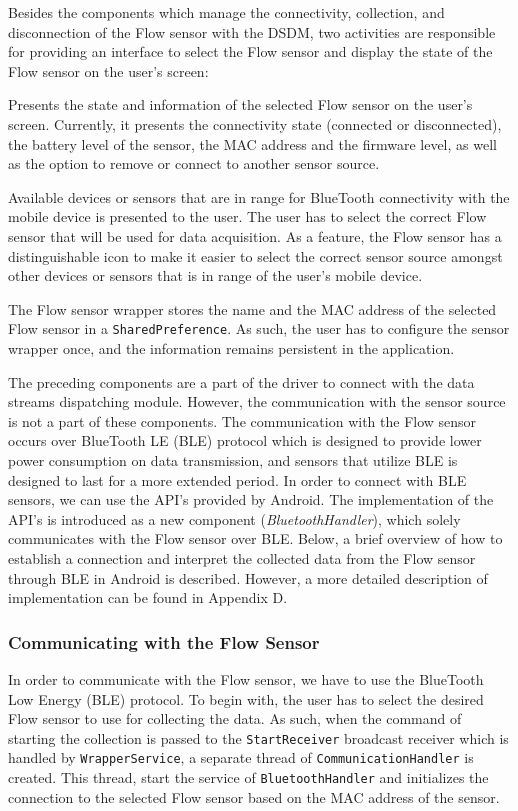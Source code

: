 Besides the components which manage the connectivity, collection, and disconnection of the Flow sensor with the DSDM, two activities are responsible for providing an interface to select the Flow sensor and display the state of the Flow sensor on the user's screen:
\begin{description}[font=\normalfont\itshape]
    \item[MainActivity:] Presents the state and information of the selected Flow sensor on the user's screen. Currently, it presents the connectivity state (connected or disconnected), the battery level of the sensor, the MAC address and the firmware level, as well as the option to remove or connect to another sensor source. 
    \item[DeviceListActivity:] Available devices or sensors that are in range for BlueTooth connectivity with the mobile device is presented to the user. The user has to select the correct  Flow sensor that will be used for data acquisition.  As a feature, the Flow sensor has a distinguishable icon to make it easier to select the correct sensor source amongst other devices or sensors that is in range of the user's mobile device.
\end{description}
The Flow sensor wrapper stores the name and the MAC address of the selected Flow sensor in a \verb|SharedPreference|. As such, the user has to configure the sensor wrapper once, and the information remains persistent in the application.

The preceding components are a part of the driver to connect with the data streams dispatching module. However, the communication with the sensor source is not a part of these components. The communication with the Flow sensor occurs over BlueTooth LE (BLE) protocol which is designed to provide lower power consumption on data transmission, and sensors that utilize BLE is designed to last for a more extended period. In order to connect with BLE sensors, we can use the API's provided by Android. The implementation of the API's is introduced as a new component (\textit{BluetoothHandler}), which solely communicates with the Flow sensor over BLE. Below, a brief overview of how to establish a connection and interpret the collected data from the Flow sensor through BLE in Android is described. However, a more detailed description of implementation can be found in Appendix D.


\subsubsection{Communicating with the Flow Sensor}\label{imp:comflow}
In order to communicate with the Flow sensor, we have to use the BlueTooth Low Energy (BLE) protocol. To begin with, the user has to select the desired Flow sensor to use for collecting the data. As such, when the command of starting the collection is passed to the \verb|StartReceiver| broadcast receiver which is handled by \verb|WrapperService|, a separate thread of \verb|CommunicationHandler| is created. This thread, start the service of \verb|BluetoothHandler| and initializes the connection to the selected Flow sensor based on the MAC address of the sensor. 

